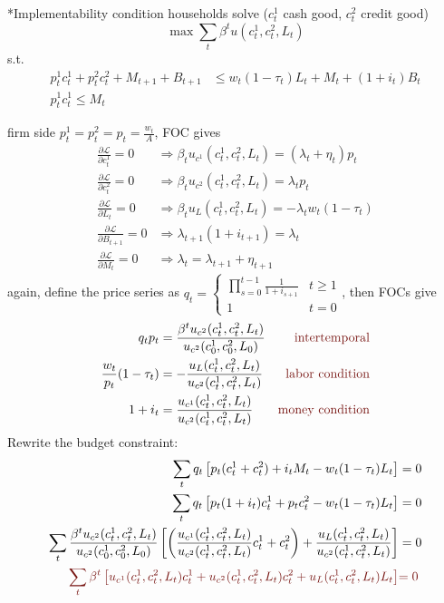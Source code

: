 \documentclass[10pt,landscape,a4paper]{article}
\makeatletter
\renewcommand{\subsection}{\@startsection{subsection}{1}{0mm}{.2ex}{.2ex}{\small\bfseries}}
\makeatother
\begin{document}
\begin{multicols*}{3}
\subsection*{Implementability condition}
households solve ($c^1_t$ cash good, $c^2_t$ credit good)
$$
\max \sum_t \beta^t u(c^1_t,c^2_t,L_t)
$$
s.t.
\begin{align*}
    p^1_t c^1_t +p^2_t c^2_t + M_{t+1}+B_{t+1} &\leq w_t(1-\tau_t)L_t + M_t + (1+i_t)B_t\\
    p^1_t c^1_t \leq M_t
\end{align*}

firm side $p^1_t=p^2_t=p_t = \frac{w_t}{A}$, FOC gives
$$
\begin{aligned}
    \frac{\partial \mathcal{L}}{\partial c^1_t}=0 &\Rightarrow \beta_t u_{c^1}(c_t^1,c_t^2,L_t)=(\lambda_t+\eta_t) p_t \\
    \frac{\partial \mathcal{L}}{\partial c^2_t}=0 &\Rightarrow \beta_t u_{c^2}(c_t^1,c_t^2,L_t)=\lambda_t p_t \\
    \frac{\partial \mathcal{L}}{\partial L_t}=0 &\Rightarrow \beta_t u_{L}(c_t^1,c_t^2,L_t)=-\lambda_t w_t(1-\tau_t) \\
    \frac{\partial \mathcal{L}}{\partial B_{t+1}}=0 &\Rightarrow \lambda_{t+1}(1+i_{t+1}) = \lambda_t \\
    \frac{\partial \mathcal{L}}{\partial M_t}=0 &\Rightarrow \lambda_t = \lambda_{t+1}+\eta_{t+1}
\end{aligned}
$$
again, define the price series as $q_t = \begin{cases}
\prod^{t-1}_{s=0}\frac{1}{1+i_{s+1}} & t\geq 1\\
1 & t=0
\end{cases}$, then FOCs give
\begin{align*}
    q_tp_t &= \frac{\beta^t u_{c^2}(c_t^1,c_t^2,L_t)}{u_{c^2}(c_0^1,c_0^2,L_0)}  &\text{\color{myred}intertemporal}\\
    \frac{w_t}{p_t}(1-\tau_t) &= -\frac{u_L(c_t^1,c_t^2,L_t)}{u_{c^2}(c_t^1,c_t^2,L_t)} &\text{\color{myred}labor condition}\\
    1+i_t &= \frac{u_{c^1}(c_t^1,c_t^2,L_t)}{u_{c^2}(c_t^1,c_t^2,L_t)} &\text{\color{myred}money condition}
\end{align*}
Rewrite the budget constraint:
\begin{align*}
    \sum_t q_t \left[ p_t(c_t^1+c_t^2) +i_tM_t -w_t(1-\tau_t)L_t \right] &=0\\
    \sum_t q_t \left[ p_t(1+i_t)c_t^1+p_tc_t^2 -w_t(1-\tau_t)L_t \right] &=0\\
    \sum_t \frac{\beta^t u_{c^2}(c_t^1,c_t^2,L_t)}{u_{c^2}(c_0^1,c_0^2,L_0)} \left[ \left( \frac{u_{c^1}(c_t^1,c_t^2,L_t)}{u_{c^2}(c_t^1,c_t^2,L_t)}c_t^1 +c_t^2 \right) +\frac{u_{L}(c_t^1,c_t^2,L_t)}{u_{c^2}(c_t^1,c_t^2,L_t)} \right] &=0\\
    {\color{myred}\sum_t\beta^t \left[ u_{c^1}(c_t^1,c_t^2,L_t)c_t^1+ u_{c^2}(c_t^1,c_t^2,L_t)c_t^2 + u_{L}(c_t^1,c_t^2,L_t)L_t \right]} &{\color{myred}= 0}
\end{align*}


\end{multicols*}
\end{document}

